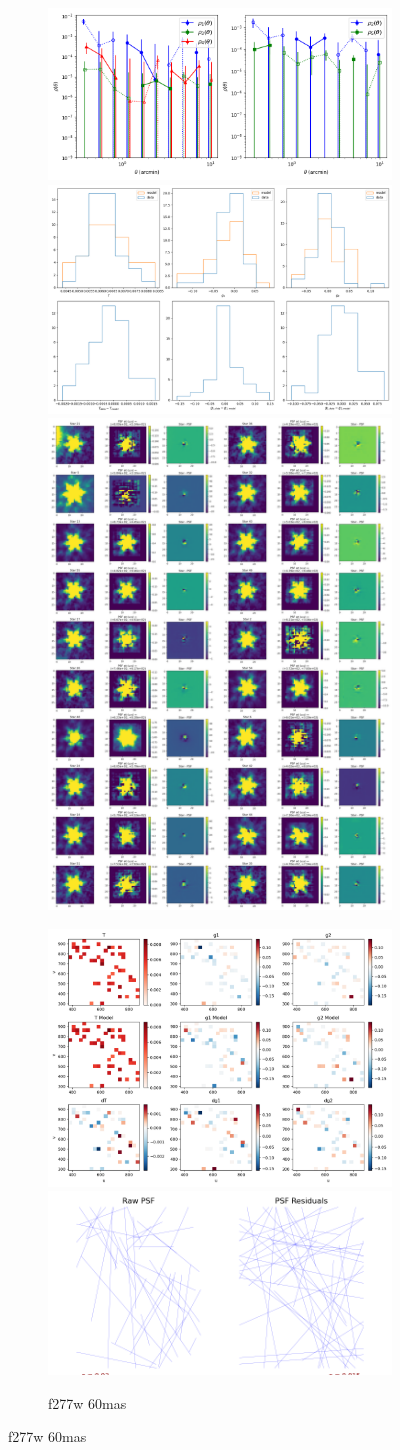 \documentclass[a4 paper]{article}
\numberwithin{equation}{section}
\newcommand{\0}{\mathbf{0}}
\begin{document}
\begin{figure}[!h]
  \begin{subfigure}{\linewidth}
  \includegraphics[width=.3\linewidth]{277.60.54/piff_rho.png}\hfill
  \includegraphics[width=.3\linewidth]{277.60.54/piff_shapes.png}\hfill
  \includegraphics[width=.3\linewidth]{277.60.54/piff_stars.png}
  \end{subfigure}\par\medskip
  \begin{subfigure}{\linewidth}
  \includegraphics[width=.3\linewidth]{277.60.54/piff_twod.png}\hfill
  \includegraphics[width=.3\linewidth]{277.60.54/piff_whisker.png}\hfill
  \caption{f277w 60mas}
  \end{subfigure}\par\medskip


\end{figure}\\
\end{document}
